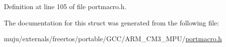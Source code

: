 Definition at line 105 of file portmacro.\+h.



The documentation for this struct was generated from the following file\+:\begin{DoxyCompactItemize}
\item 
muju/externals/freertos/portable/\+G\+C\+C/\+A\+R\+M\+\_\+\+C\+M3\+\_\+\+M\+P\+U/\hyperlink{externals_2freertos_2portable_2_g_c_c_2_a_r_m___c_m3___m_p_u_2portmacro_8h}{portmacro.\+h}\end{DoxyCompactItemize}
